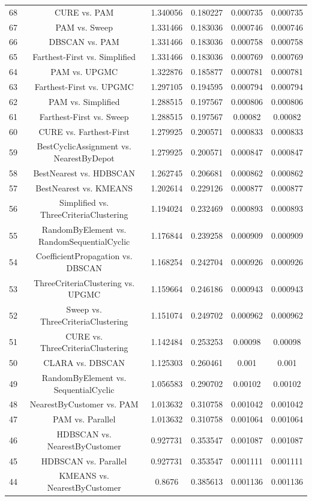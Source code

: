 \documentclass[a4paper,10pt]{article}
\begin{document}
\begin{landscape}
\begin{table}[!htp]
\begin{tabular}{cccccc}
68&CURE vs. PAM&1.340056&0.180227&0.000735&0.000735\\
67&PAM vs. Sweep&1.331466&0.183036&0.000746&0.000746\\
66&DBSCAN vs. PAM&1.331466&0.183036&0.000758&0.000758\\
65&Farthest-First vs. Simplified&1.331466&0.183036&0.000769&0.000769\\
64&PAM vs. UPGMC&1.322876&0.185877&0.000781&0.000781\\
63&Farthest-First vs. UPGMC&1.297105&0.194595&0.000794&0.000794\\
62&PAM vs. Simplified&1.288515&0.197567&0.000806&0.000806\\
61&Farthest-First vs. Sweep&1.288515&0.197567&0.00082&0.00082\\
60&CURE vs. Farthest-First&1.279925&0.200571&0.000833&0.000833\\
59&BestCyclicAssignment vs. NearestByDepot&1.279925&0.200571&0.000847&0.000847\\
58&BestNearest vs. HDBSCAN&1.262745&0.206681&0.000862&0.000862\\
57&BestNearest vs. KMEANS&1.202614&0.229126&0.000877&0.000877\\
56&Simplified vs. ThreeCriteriaClustering&1.194024&0.232469&0.000893&0.000893\\
55&RandomByElement vs. RandomSequentialCyclic&1.176844&0.239258&0.000909&0.000909\\
54&CoefficientPropagation vs. DBSCAN&1.168254&0.242704&0.000926&0.000926\\
53&ThreeCriteriaClustering vs. UPGMC&1.159664&0.246186&0.000943&0.000943\\
52&Sweep vs. ThreeCriteriaClustering&1.151074&0.249702&0.000962&0.000962\\
51&CURE vs. ThreeCriteriaClustering&1.142484&0.253253&0.00098&0.00098\\
50&CLARA vs. DBSCAN&1.125303&0.260461&0.001&0.001\\
49&RandomByElement vs. SequentialCyclic&1.056583&0.290702&0.00102&0.00102\\
48&NearestByCustomer vs. PAM&1.013632&0.310758&0.001042&0.001042\\
47&PAM vs. Parallel&1.013632&0.310758&0.001064&0.001064\\
46&HDBSCAN vs. NearestByCustomer&0.927731&0.353547&0.001087&0.001087\\
45&HDBSCAN vs. Parallel&0.927731&0.353547&0.001111&0.001111\\
44&KMEANS vs. NearestByCustomer&0.8676&0.385613&0.001136&0.001136\\

\end{tabular}
\end{table}
\end{landscape}
\end{document}
